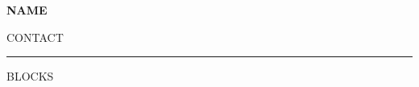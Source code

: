 \documentclass[10pt,a4paper]{article}
\begin{document}
{\LARGE\bfseries {{NAME}}}\par
{{CONTACT}}
\vspace{3mm}\hrule\vspace{3mm}
{{BLOCKS}}
\end{document}
